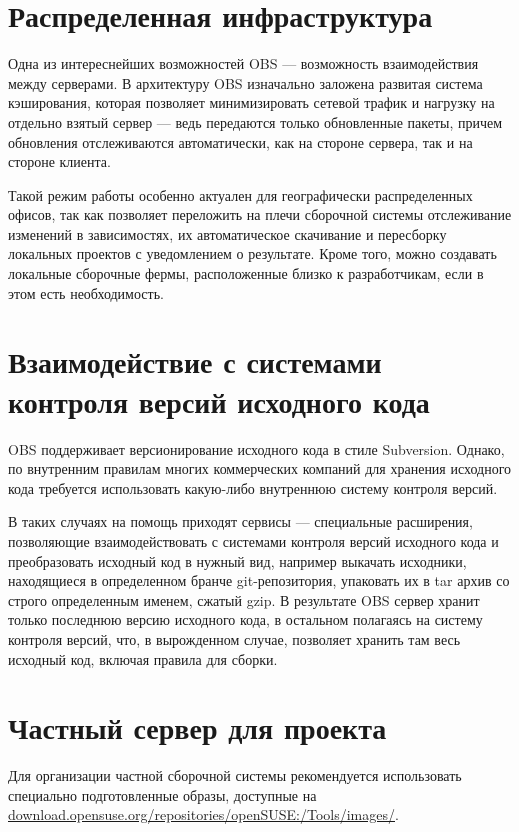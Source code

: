 \documentclass[10pt, a5paper]{article}
\begin{document}
\section*{Распределенная инфраструктура}

Одна из интереснейших возможностей OBS --- возможность взаимодействия между серверами.
В архитектуру OBS изначально заложена развитая система кэширования, которая позволяет минимизировать сетевой трафик и нагрузку на отдельно взятый сервер --- ведь передаются только обновленные пакеты, причем обновления отслеживаются автоматически, как на стороне сервера, так и на стороне клиента.

Такой режим работы особенно актуален для географически распределенных офисов, так как позволяет переложить на плечи сборочной системы отслеживание изменений в зависимостях, их автоматическое скачивание и пересборку локальных проектов с уведомлением о результате. Кроме того, можно  создавать локальные сборочные фермы, расположенные близко к разработчикам, если в этом есть необходимость.

\section*{Взаимодействие с системами контроля версий исходного кода}

OBS поддерживает версионирование исходного кода в стиле \linebreak Subversion. Однако, по внутренним правилам многих коммерческих компаний для хранения исходного кода требуется использовать какую-либо внутреннюю систему контроля версий.

В таких случаях на помощь приходят сервисы --- специальные расширения, позволяющие взаимодействовать с системами контроля версий исходного кода и преобразовать исходный код в нужный вид, например выкачать исходники, находящиеся в определенном бранче git-репозитория, упаковать их в tar архив со строго определенным именем, сжатый gzip. В результате OBS сервер хранит только последнюю версию исходного кода, в остальном полагаясь на систему контроля версий, что, в вырожденном случае, позволяет хранить там весь исходный код, включая правила для сборки.

\section*{Частный сервер для проекта}

Для организации частной сборочной системы рекомендуется \cite{Pynkin2} использовать специально подготовленные образы, доступные на \linebreak \url{download.opensuse.org/repositories/openSUSE:/Tools/images/}.
\end{document}
